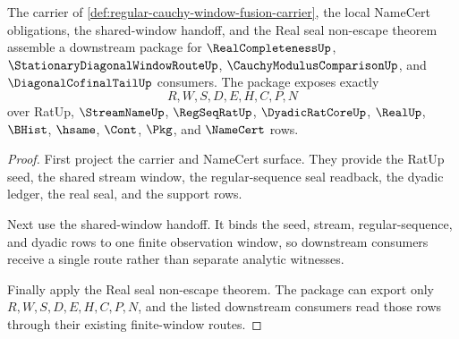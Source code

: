 \begin{theorem}
\label{thm:regular-cauchy-window-fusion-downstream-package}
The carrier of \autoref{def:regular-cauchy-window-fusion-carrier}, the local NameCert obligations, the shared-window handoff, and the Real seal non-escape theorem assemble a downstream package for $\RealCompletenessUp$, $\StationaryDiagonalWindowRouteUp$, $\CauchyModulusComparisonUp$, and $\DiagonalCofinalTailUp$ consumers. The package exposes exactly
$$
R,W,S,D,E,H,C,P,N
$$
over RatUp, $\StreamNameUp$, $\RegSeqRatUp$, $\DyadicRatCoreUp$, $\RealUp$, $\BHist$, $\hsame$, $\Cont$, $\Pkg$, and $\NameCert$ rows.
\end{theorem}
\begin{proof}
First project the carrier and NameCert surface. They provide the RatUp seed, the shared stream window, the regular-sequence seal readback, the dyadic ledger, the real seal, and the support rows.

Next use the shared-window handoff. It binds the seed, stream, regular-sequence, and dyadic rows to one finite observation window, so downstream consumers receive a single route rather than separate analytic witnesses.

Finally apply the Real seal non-escape theorem. The package can export only $R,W,S,D,E,H,C,P,N$, and the listed downstream consumers read those rows through their existing finite-window routes.
\end{proof}

